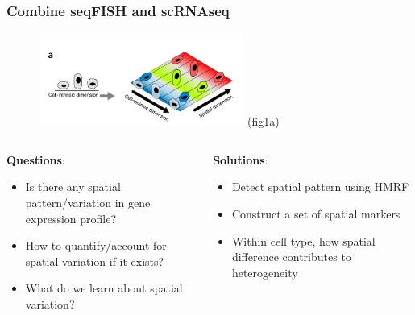 \documentclass{beamer}
\begin{document}
  \begin{frame}
  \frametitle{Combine seqFISH and scRNAseq}
  \begin{figure}
    \centering
    \includegraphics[width=0.6\textwidth]{variation} (fig1a)
  \end{figure}
  \begin{columns}
  \begin{column}{0.5\textwidth}
    \textbf{Questions}:
    \begin{itemize}
      \item Is there any spatial pattern/variation in gene expression profile?
      \item How to quantify/account for spatial variation if it exists?
      \item What do we learn about spatial variation?
    \end{itemize}
  \end{column}
  \begin{column}{0.5\textwidth}  %
    \textbf{Solutions}:
    \begin{itemize}
      \item Detect spatial pattern using HMRF
      \item Construct a set of spatial markers
      \item Within cell type, how spatial difference contributes to heterogeneity
    \end{itemize}
  \end{column}
  \end{columns}
  \end{frame}
\end{document}
